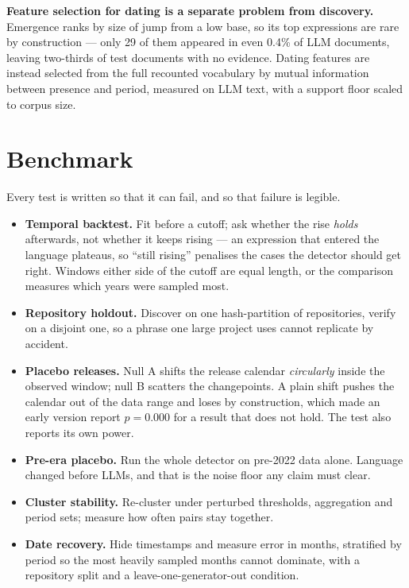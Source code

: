 \documentclass[11pt,a4paper]{article}
\begin{document}
\textbf{Feature selection for dating is a separate problem from discovery.} Emergence
ranks by size of jump from a low base, so its top expressions are rare by
construction --- only 29 of them appeared in even 0.4\% of LLM documents, leaving
two-thirds of test documents with no evidence. Dating features are instead selected
from the full recounted vocabulary by mutual information between presence and period,
measured on LLM text, with a support floor scaled to corpus size.

\section{Benchmark}

Every test is written so that it can fail, and so that failure is legible.

\begin{itemize}
  \item \textbf{Temporal backtest.} Fit before a cutoff; ask whether the rise
  \emph{holds} afterwards, not whether it keeps rising --- an expression that entered
  the language plateaus, so ``still rising'' penalises the cases the detector should
  get right. Windows either side of the cutoff are equal length, or the comparison
  measures which years were sampled most.
  \item \textbf{Repository holdout.} Discover on one hash-partition of repositories,
  verify on a disjoint one, so a phrase one large project uses cannot replicate by
  accident.
  \item \textbf{Placebo releases.} Null A shifts the release calendar
  \emph{circularly} inside the observed window; null B scatters the changepoints. A
  plain shift pushes the calendar out of the data range and loses by construction,
  which made an early version report $p=0.000$ for a result that does not hold. The
  test also reports its own power.
  \item \textbf{Pre-era placebo.} Run the whole detector on pre-2022 data alone.
  Language changed before LLMs, and that is the noise floor any claim must clear.
  \item \textbf{Cluster stability.} Re-cluster under perturbed thresholds, aggregation
  and period sets; measure how often pairs stay together.
  \item \textbf{Date recovery.} Hide timestamps and measure error in months, stratified
  by period so the most heavily sampled months cannot dominate, with a repository split
  and a leave-one-generator-out condition.
\end{itemize}
\end{document}
